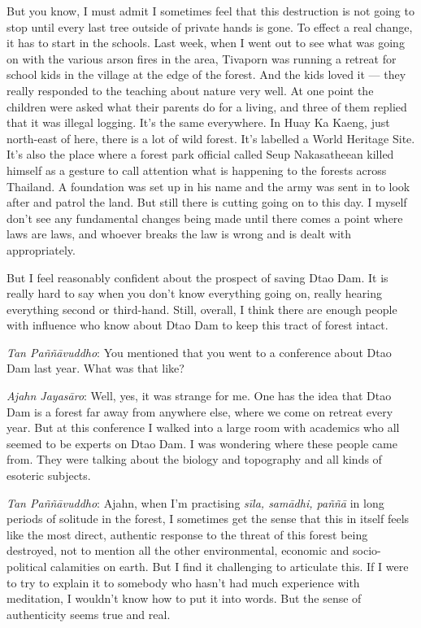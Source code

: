 But you know, I must admit I sometimes feel that this destruction is not
going to stop until every last tree outside of private hands is gone. To
effect a real change, it has to start in the schools. Last week, when I
went out to see what was going on with the various arson fires in the
area, Tivaporn was running a retreat for school kids in the village at
the edge of the forest. And the kids loved it --- they really responded
to the teaching about nature very well. At one point the children were
asked what their parents do for a living, and three of them replied that
it was illegal logging. It's the same everywhere. In Huay Ka Kaeng, just
north-east of here, there is a lot of wild forest. It's labelled a World
Heritage Site. It's also the place where a forest park official called
Seup Nakasatheean killed himself as a gesture to call attention what is
happening to the forests across Thailand. A foundation was set up in his
name and the army was sent in to look after and patrol the land. But
still there is cutting going on to this day. I myself don't see any
fundamental changes being made until there comes a point where laws are
laws, and whoever breaks the law is wrong and is dealt with
appropriately.

But I feel reasonably confident about the prospect of saving Dtao Dam.
It is really hard to say when you don't know everything going on, really
hearing everything second or third-hand. Still, overall, I think there
are enough people with influence who know about Dtao Dam to keep this
tract of forest intact.

\emph{Tan Paññāvuddho}‎: You mentioned that you went to a conference
about Dtao Dam last year. What was that like?

\emph{Ajahn Jayasāro‎}: Well, yes, it was strange for me. One has the
idea that Dtao Dam is a forest far away from anywhere else, where we
come on retreat every year. But at this conference I walked into a large
room with academics who all seemed to be experts on Dtao Dam. I was
wondering where these people came from. They were talking about the
biology and topography and all kinds of esoteric subjects.

\emph{Tan Paññāvuddho}‎: Ajahn, when I'm practising \emph{sīla, samādhi,
paññā} in long periods of solitude in the forest, I sometimes get the
sense that this in itself feels like the most direct, authentic response
to the threat of this forest being destroyed, not to mention all the
other environmental, economic and socio-political calamities on earth.
But I find it challenging to articulate this. If I were to try to
explain it to somebody who hasn't had much experience with meditation, I
wouldn't know how to put it into words. But the sense of authenticity
seems true and real.

